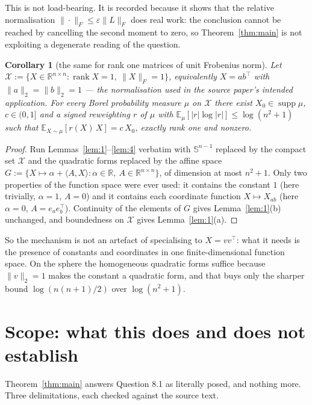 \documentclass[11pt]{article}
\newtheorem{corollary}[theorem]{Corollary}
\theoremstyle{remark}
\newcommand{\Sph}{\mathbb{S}^{n-1}}
\newcommand{\R}{\mathbb{R}}
\newcommand{\Ex}{\mathbb{E}}
\newcommand{\supp}{\operatorname{supp}}
\begin{document}
\noindent This is not load-bearing. It is recorded because it shows that the relative
normalisation $\|\cdot\|_F\leq\varepsilon\|L\|_F$ does real work: the conclusion cannot be
reached by cancelling the second moment to zero, so Theorem~\ref{thm:main} is not exploiting a
degenerate reading of the question.

\begin{corollary}[the same for rank one matrices of unit Frobenius norm]\label{cor:B}
Let $\mathcal{X}:=\{X\in\R^{n\times n} : \operatorname{rank}X=1,\ \|X\|_F=1\}$, equivalently
$X=ab^{\top}$ with $\|a\|_2=\|b\|_2=1$ --- the normalisation used in the source paper's
intended application. For every Borel probability measure $\mu$ on $\mathcal{X}$ there exist
$X_0\in\supp\mu$, $c\in(0,1]$ and a signed reweighting $r$ of $\mu$ with
$\Ex_\mu[|r|\log|r|]\leq\log(n^2+1)$ such that $\Ex_{X\sim\mu}[r(X)\,X]=c\,X_0$, exactly rank
one and nonzero.
\end{corollary}

\begin{proof}
Run Lemmas~\ref{lem:1}--\ref{lem:4} verbatim with $\Sph$ replaced by the compact set
$\mathcal{X}$ and the quadratic forms replaced by the affine space
$G:=\{X\mapsto \alpha+\langle A,X\rangle : \alpha\in\R,\ A\in\R^{n\times n}\}$, of dimension at
most $n^2+1$. Only two properties of the function space were ever used: it contains the
constant $1$ (here trivially, $\alpha=1$, $A=0$) and it contains each coordinate function
$X\mapsto X_{ab}$ (here $\alpha=0$, $A=e_ae_b^{\top}$). Continuity of the elements of $G$ gives
Lemma~\ref{lem:1}(b) unchanged, and boundedness on $\mathcal{X}$ gives Lemma~\ref{lem:1}(a).
\end{proof}

\noindent So the mechanism is not an artefact of specialising to $X=vv^{\top}$: what it needs
is the presence of constants and coordinates in one finite-dimensional function space. On the
sphere the homogeneous quadratic forms suffice because $\|v\|_2=1$ makes the constant a
quadratic form, and that buys only the sharper bound $\log(n(n+1)/2)$ over $\log(n^2+1)$.

\section{Scope: what this does and does not establish}

Theorem~\ref{thm:main} answers Question 8.1 as literally posed, and nothing more. Three
delimitations, each checked against the source text.
\end{document}
